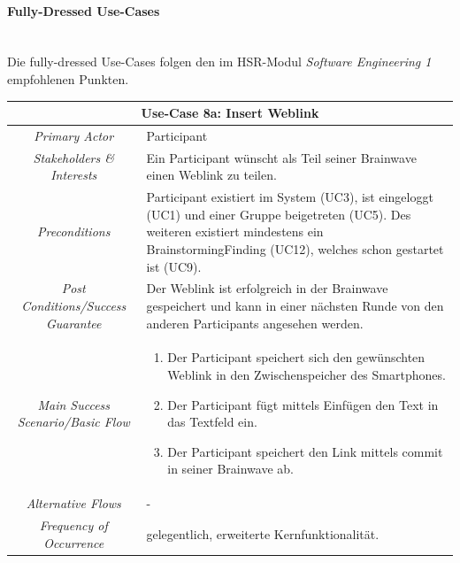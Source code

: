 \paragraph{Fully-Dressed Use-Cases}
\label{par:fully-dressed-uc}~\\
Die fully-dressed Use-Cases folgen den im HSR-Modul \textit{Software Engineering 1} empfohlenen Punkten.
\renewcommand{\arraystretch}{1.35}
\begin{center}
	\begin{longtable}{| c | p{7cm} |}
		\hline
		\multicolumn{2}{|c|}{\textbf{Use-Case 8a: Insert Weblink}}\\
		\hline\hline
		\textit{Primary Actor} & Participant\\
		\hline
		\textit{Stakeholders \& Interests} & Ein Participant wünscht als Teil seiner Brainwave einen Weblink zu teilen. \\
		\hline
		\textit{Preconditions} & Participant existiert im System (UC3), ist eingeloggt (UC1) und einer Gruppe beigetreten (UC5). Des weiteren existiert mindestens ein BrainstormingFinding (UC12), welches schon gestartet ist (UC9).\\
		\hline
		\textit{Post Conditions/Success Guarantee} & Der Weblink ist erfolgreich in der Brainwave gespeichert und kann in einer nächsten Runde von den anderen Participants angesehen werden.\\
		\hline
		\textit{Main Success Scenario/Basic Flow} & 
		\begin{enumerate}[noitemsep]
			\item Der Participant speichert sich den gewünschten Weblink in den Zwischenspeicher des Smartphones.
			\item Der Participant fügt mittels Einfügen den Text in das Textfeld ein.
			\item Der Participant speichert den Link mittels commit in seiner Brainwave ab.
		\end{enumerate}\\
		\hline
		\textit{Alternative Flows} &
		-\\
		\hline
		\textit{Frequency of Occurrence} & gelegentlich, erweiterte Kernfunktionalität.\\
		\hline
	\end{longtable}
\end{center}

